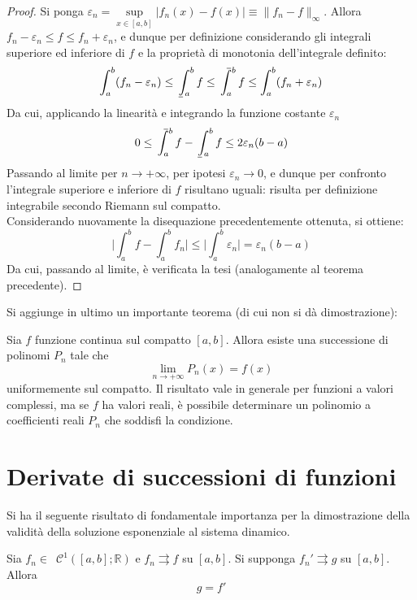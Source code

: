 \documentclass[10pt, oneside]{book}
\theoremstyle{plain}
\def\upint{\mathchoice%
    {\mkern13mu\overline{\vphantom{\intop}\mkern7mu}\mkern-20mu}%
    {\mkern7mu\overline{\vphantom{\intop}\mkern7mu}\mkern-14mu}%
    {\mkern7mu\overline{\vphantom{\intop}\mkern7mu}\mkern-14mu}%
    {\mkern7mu\overline{\vphantom{\intop}\mkern7mu}\mkern-14mu}%
  \int}
\def\lowint{\mkern3mu\underline{\vphantom{\intop}\mkern7mu}\mkern-10mu\int}
\begin{document}
\begin{proof}
Si ponga $\displaystyle \varepsilon_n = \sup\limits_{x \in [a,b]} |f_n(x) - f(x)| \equiv \| f_n - f \|_\infty$. Allora $\displaystyle f_n - \varepsilon_n \leq f \leq f_n + \varepsilon_n$, e dunque per definizione considerando gli integrali superiore ed inferiore di $f$ e la proprietà di monotonia dell'integrale definito:
\[\int_{a}^{b}(f_n - \varepsilon_n) \leq \lowint_{a}^{b} f \leq \upint_{a}^{b}f \leq \int_{a}^{b}(f_n + \varepsilon_n)\]
Da cui, applicando la linearità e integrando la funzione costante $\varepsilon_n$
\[0 \leq \upint_{a}^{b}f - \lowint_{a}^{b}f \leq 2\varepsilon_n (b - a)\]
Passando al limite per $n \rightarrow +\infty$, per ipotesi $\varepsilon_n \rightarrow 0$, e dunque per confronto l'integrale superiore e inferiore di $f$ risultano uguali: risulta per definizione integrabile secondo Riemann sul compatto. 
\\Considerando nuovamente la disequazione precedentemente ottenuta, si ottiene:
\[\bigg|\int_{a}^{b}f - \int_{a}^{b}f_n\bigg| \leq \bigg|\int_{a}^{b}\varepsilon_n\bigg| = \varepsilon_n (b-a)\]
Da cui, passando al limite, è verificata la tesi (analogamente al teorema precedente). 
\end{proof}

Si aggiunge in ultimo un importante teorema (di cui non si dà dimostrazione):
\begin{ther}
Sia $f$ funzione continua sul compatto $[a,b]$. Allora esiste una successione di polinomi $P_n$ tale che
\[\lim\limits_{n \rightarrow +\infty} P_n(x) = f(x)\]
uniformemente sul compatto. Il risultato vale in generale per funzioni a valori complessi, ma se $f$ ha valori reali, è possibile determinare un polinomio a coefficienti reali $P_n$ che soddisfi la condizione.
\end{ther}

\section{Derivate di successioni di funzioni}
Si ha il seguente risultato di fondamentale importanza per la dimostrazione della validità della soluzione esponenziale al sistema dinamico.
\begin{ther}
Sia $f_n \in \enspace \mathcal{C}^{1}([a,b] ; \mathbb{R})$ e $f_n \rightrightarrows f$ su $[a,b]$. Si supponga $f_n' \rightrightarrows g$ su $[a,b]$. Allora
\[g = f'\]
\end{ther}
\end{document}
